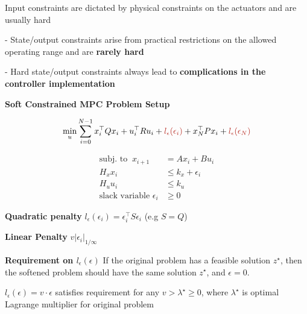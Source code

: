 Input constraints are dictated by physical constraints on
the actuators and are usually hard

- State/output constraints arise from practical restrictions
on the allowed operating range and are \textbf{rarely hard}

- Hard state/output constraints always lead to
\textbf{complications in the controller implementation}

\begin{sstTitleBox}[ForestGreen]{\center\textbf{\large
			Soft Constrained MPC Problem Setup
		}
	}


	\begin{adjustbox}{rndcorners=0.5mm}
		\begin{sstOnlyFrame}[ForestGreen]
			\[
				\min_u\sum_{i=0}^{N-1}
				x_i^\top Q x_i + u_i^\top R u_i
				+\color{BrickRed}l_\epsilon(\epsilon_i)\color{black}
				+x_N^\top P x_i
				+\color{BrickRed}l_\epsilon(\epsilon_N)
			\]
		\end{sstOnlyFrame}
	\end{adjustbox}
	\[\begin{aligned}
			\text{subj.\ to }\   x_{i+1}      & = Ax_i + Bu_i      \\
			H_xx_i                            & \le k_x+\epsilon_i \\
			H_uu_i                            & \le k_u            \\
			\text{slack variable }	\epsilon_i & \ge0
		\end{aligned}\]

\end{sstTitleBox}

\textbf{Quadratic penalty}
$l_\epsilon(\epsilon_i) =
	\epsilon_i^\top S \epsilon_i$ (e.g $S = Q$)

\textbf{Linear Penalty}
$v|\epsilon_i|_{1/\infty}$


\textbf{Requirement on $l_\epsilon(\epsilon)$}
If the original problem has a feasible solution $z^\star$,
then the softened problem should have the same solution $z^\star$,
and $\epsilon = 0$.

\begin{theorem}
	$l_\epsilon(\epsilon) = v \cdot \epsilon$ satisfies requirement for any $v > \lambda^\star \geq 0$,
	where $\lambda^\star$ is optimal Lagrange multiplier for original problem
\end{theorem}


